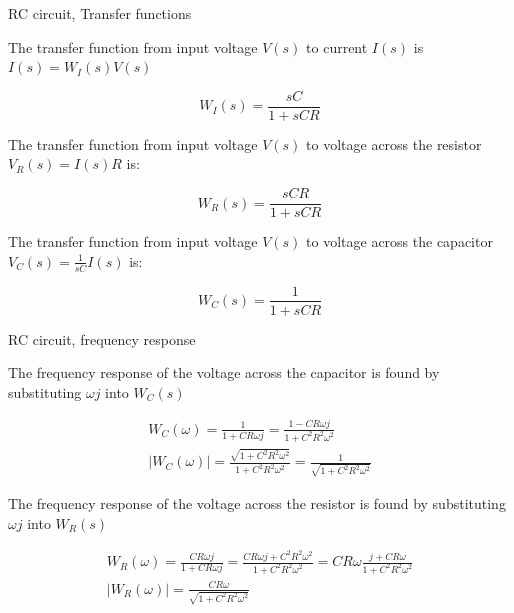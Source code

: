 \documentclass{beamer}
\begin{document}
\begin{frame}{RC circuit, Transfer functions}
	\begin{flushleft}
		
		The transfer function from input voltage $V(s)$ to current $I(s)$ is $I(s) =  W_I(s)V(s)$
		
		\begin{equation}
			W_I(s) = \frac{sC}{1 + sCR}
		\end{equation}
		
		The transfer function from input voltage $V(s)$ to voltage across the resistor $V_R(s) = I(s) R$ is:
		
		\begin{equation}
			W_R(s) = \frac{sCR}{1 + sCR}
		\end{equation}
	
		The transfer function from input voltage $V(s)$ to voltage across the capacitor $V_C(s) = \frac{1}{sC}I(s)$ is:
	
		\begin{equation}
		W_C(s) = \frac{1}{1 + sCR}
		\end{equation}
		
		
	\end{flushleft}
\end{frame}



\begin{frame}{RC circuit, frequency response}
	\begin{flushleft}
		
		The frequency response of the voltage across the capacitor is found by substituting $\omega j$ into $W_C(s)$
		
		\begin{align}
			W_C(\omega) = \frac{1}{1 + CR\omega j} = \frac{1 - CR\omega j}{1 + C^2 R^2 \omega^2} \\
			| W_C(\omega) | = \frac{\sqrt{1 + C^2 R^2 \omega^2}}{1 + C^2 R^2 \omega^2} 
			= \frac{1}{\sqrt{1 + C^2 R^2 \omega^2}} 
		\end{align}
		
		The frequency response of the voltage across the resistor is found by substituting $\omega j$ into $W_R(s)$
		
		\begin{align*}
			W_R(\omega) = \frac{CR\omega j}{1 + CR\omega j} = \frac{CR\omega j + C^2R^2\omega^2}{1 + C^2 R^2 \omega^2} = CR\omega\frac{ j + CR\omega}{1 + C^2 R^2 \omega^2} \\
			| W_R(\omega) | 
			=  \frac{ CR\omega}{\sqrt{1 + C^2 R^2 \omega^2}} 
		\end{align*}
		
	\end{flushleft}
\end{frame}
\end{document}
